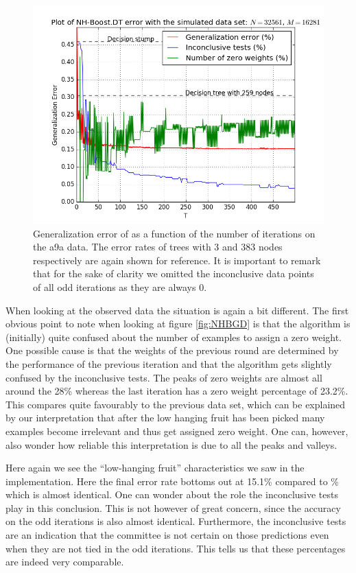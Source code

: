 \begin{figure}[!ht]
  \centering
      \includegraphics[width=\graphWidth]{generated/NHSVM.png}
  \caption{Generalization error of \NHB as a function of the number of iterations on the a9a data. The error rates of trees with 3 and 383 nodes respectively are again shown for reference. It is important to remark that for the sake of clarity we omitted the inconclusive data points of all odd iterations as they are always 0.}
      \label{fig:NHBSVM}
\end{figure}

\par When looking at the observed data the situation is again a bit different. The first obvious point to note when looking at figure \ref{fig:NHBGD} is that the algorithm is (initially) quite confused about the number of examples to assign a zero weight. One possible cause is that the weights of the previous round are determined by the performance of the previous iteration and that the algorithm gets slightly confused by the inconclusive tests. The peaks of zero weights are almost all around the 28\% whereas the last iteration has a zero weight percentage of 23.2\%. This compares quite favourably to the previous data set, which can be explained by our interpretation that after the low hanging fruit has been picked many examples become irrelevant and thus get assigned zero weight. One can, however, also wonder how reliable this interpretation is due to all the peaks and valleys. 
\par Here again we see the ``low-hanging fruit'' characteristics we saw in the \adaB implementation. Here the final error rate bottoms out at 15.1\% compared to \% which is almost identical. One can wonder about the role the inconclusive tests play in this conclusion. This is not however of great concern, since the accuracy on the odd iterations is also almost identical. Furthermore, the inconclusive tests are an indication that the committee is not certain on those predictions even when they are not tied in the odd iterations. This tells us that these percentages are indeed very comparable.  
\FloatBarrier
